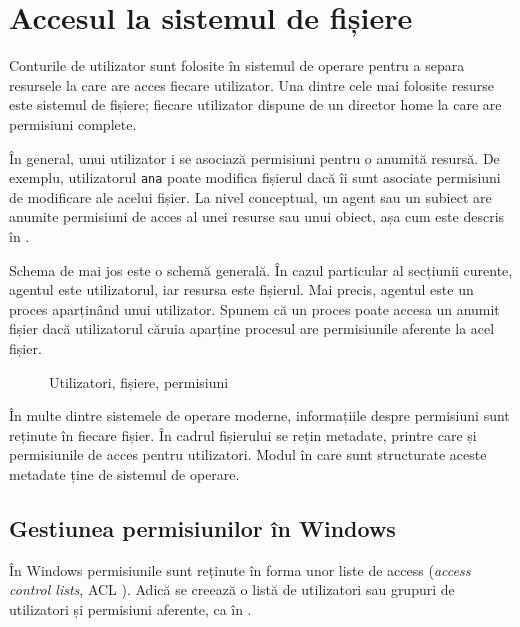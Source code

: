 \section{Accesul la sistemul de fișiere}
\label{sec:user:fs-access}

Conturile de utilizator sunt folosite în sistemul de operare pentru a separa
resursele la care are acces fiecare utilizator. Una dintre cele mai folosite resurse
este sistemul de fișiere; fiecare utilizator dispune de un director home la care
are permisiuni complete.

În general, unui utilizator i se asociază permisiuni pentru o anumită resursă.
De exemplu, utilizatorul \texttt{ana} poate modifica fișierul  dacă îi sunt
asociate permisiuni de modificare ale acelui fișier. La nivel conceptual, un agent
sau un subiect are anumite permisiuni de acces al unei resurse sau unui obiect,
așa cum este descris în .

Schema de mai jos este o schemă generală. În cazul particular al secțiunii
curente, agentul este utilizatorul, iar resursa este fișierul. Mai precis,
agentul este un proces aparținând unui utilizator. Spunem că un proces poate
accesa un anumit fișier dacă utilizatorul căruia aparține procesul are
permisiunile aferente la acel fișier.

\begin{figure}[htbp]
  \centering
  \def\svgwidth{0.7\columnwidth}
  
  \caption{Utilizatori, fișiere, permisiuni}
  \label{fig:user:user-file-perm}
\end{figure}

În multe dintre sistemele de operare moderne, informațiile despre permisiuni sunt reținute în
fiecare fișier. În cadrul fișierului se rețin metadate, printre care și
permisiunile de acces pentru utilizatori. Modul în care sunt structurate aceste
metadate ține de sistemul de operare.

\subsection{Gestiunea permisiunilor în Windows}
\label{sec:user:windows-perm}

În Windows permisiunile sunt reținute în forma unor liste de access (\textit{access
control lists}, ACL ). Adică se creează o listă
de utilizatori sau grupuri de utilizatori și permisiuni aferente, ca în .

